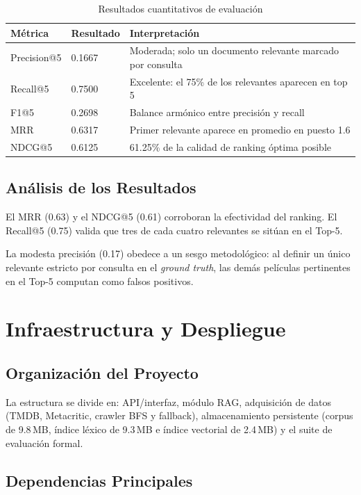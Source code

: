 \documentclass[10pt,a4paper]{llncs}
\begin{document}
\begin{table}[htbp]
\caption{Resultados cuantitativos de evaluación}
\centering
\small
\begin{tabular}{@{}lll@{}}
\toprule
\textbf{Métrica} & \textbf{Resultado} & \textbf{Interpretación} \\
\midrule
Precision@5 & 0.1667 & Moderada; solo un documento relevante marcado por consulta \\
Recall@5 & 0.7500 & Excelente: el 75\% de los relevantes aparecen en top 5 \\
F1@5 & 0.2698 & Balance armónico entre precisión y recall \\
MRR & 0.6317 & Primer relevante aparece en promedio en puesto 1.6 \\
NDCG@5 & 0.6125 & 61.25\% de la calidad de ranking óptima posible \\
\bottomrule
\end{tabular}
\label{tab:resultados}
\end{table}

\subsection{Análisis de los Resultados}

El MRR (0.63) y el NDCG@5 (0.61) corroboran la efectividad del ranking. El Recall@5 (0.75) valida que tres de cada cuatro relevantes se sitúan en el Top-5.

La modesta precisión (0.17) obedece a un sesgo metodológico: al definir un único relevante estricto por consulta en el \textit{ground truth}, las demás películas pertinentes en el Top-5 computan como falsos positivos.

\section{Infraestructura y Despliegue}

\subsection{Organización del Proyecto}

La estructura se divide en: API/interfaz, módulo RAG, adquisición de datos (TMDB, Metacritic, crawler BFS y fallback), almacenamiento persistente (corpus de 9.8\,MB, índice léxico de 9.3\,MB e índice vectorial de 2.4\,MB) y el suite de evaluación formal.

\subsection{Dependencias Principales}
\end{document}
